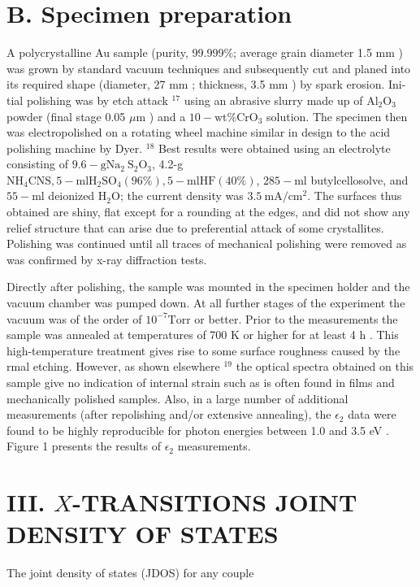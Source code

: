 \documentclass[10pt]{article}
\begin{document}
\section*{B. Specimen preparation}
A polycrystalline Au sample (purity, 99.999\%; average grain diameter 1.5 mm ) was grown by standard vacuum techniques and subsequently cut and planed into its required shape (diameter, 27 mm ; thickness, 3.5 mm ) by spark erosion. Ini-\\
tial polishing was by etch attack ${ }^{17}$ using an abrasive slurry made up of $\mathrm{Al}_{2} \mathrm{O}_{3}$ powder (final stage 0.05 $\mu \mathrm{m}$ ) and a $10-\mathrm{wt} \% \mathrm{CrO}_{3}$ solution. The specimen then was electropolished on a rotating wheel machine similar in design to the acid polishing machine by Dyer. ${ }^{18}$ Best results were obtained using an electrolyte consisting of $9.6-\mathrm{g} \mathrm{Na}_{2} \mathrm{~S}_{2} \mathrm{O}_{3}$, 4.2-g $\mathrm{NH}_{4} \mathrm{CNS}, 5-\mathrm{ml} \mathrm{H}_{2} \mathrm{SO}_{4}(96 \%), 5-\mathrm{ml} \mathrm{HF}(40 \%)$, $285-\mathrm{ml}$ butylcellosolve, and $55-\mathrm{ml}$ deionized $\mathrm{H}_{2} \mathrm{O}$; the current density was $3.5 \mathrm{~mA} / \mathrm{cm}^{2}$. The surfaces thus obtained are shiny, flat except for a rounding at the edges, and did not show any relief structure that can arise due to preferential attack of some crystallites. Polishing was continued until all traces of mechanical polishing were removed as was confirmed by x-ray diffraction tests.

Directly after polishing, the sample was mounted in the specimen holder and the vacuum chamber was pumped down. At all further stages of the experiment the vacuum was of the order of $10^{-7} \mathrm{Torr}$ or better. Prior to the measurements the sample was annealed at temperatures of 700 K or higher for at least 4 h . This high-temperature treatment gives rise to some surface roughness caused by the rmal etching. However, as shown elsewhere ${ }^{19}$ the optical spectra obtained on this sample give no indication of internal strain such as is often found in films and mechanically polished samples. Also, in a large number of additional measurements (after repolishing and/or extensive annealing), the $\epsilon_{2}$ data were found to be highly reproducible for photon energies between 1.0 and 3.5 eV . Figure 1 presents the results of $\epsilon_{2}$ measurements.

\section*{III. $X$-TRANSITIONS JOINT DENSITY OF STATES}
The joint density of states (JDOS) for any couple
\end{document}

